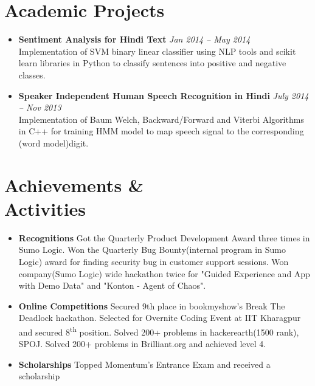 \documentclass[margin,line]{resume}
\begin{document}
\begin{resume}
    \section{\mysidestyle Academic Projects}
    \vspace{0mm}
       \begin{itemize}
            \item \textbf{Sentiment Analysis for Hindi Text} \hfill \textsl{Jan 2014 -- May 2014}\\ Implementation of SVM binary linear classifier using NLP tools and scikit learn libraries in Python to classify sentences into positive and negative classes.
            \item \textbf{Speaker Independent Human Speech Recognition in Hindi} \hfill \textsl{July 2014 -- Nov 2013}\\ Implementation of Baum Welch, Backward/Forward and Viterbi Algorithms in C++ for training HMM model to map speech signal to the corresponding (word model)digit.
       \end{itemize}
\section{\mysidestyle Achievements \& \\ Activities}
\vspace{0mm}
    \begin{itemize}
            \item \textbf{Recognitions} \vspace{0mm}
                \subitem Got the Quarterly Product Development Award three times in Sumo Logic.
                \subitem Won the Quarterly Bug Bounty(internal program in Sumo Logic) award for finding security bug in customer support sessions.
                \subitem Won company(Sumo Logic) wide hackathon twice for "Guided Experience and App with Demo Data" and  "Konton - Agent of Chaos".  
            \item \textbf{Online Competitions} \vspace{0mm}
                \subitem Secured 9th place in bookmyshow's Break The Deadlock hackathon.
                \subitem Selected for Overnite Coding Event at IIT Kharagpur and secured 8​\textsuperscript{th}​ position.
                \subitem Solved 200+ problems in hackerearth(1500 rank), SPOJ.
                \subitem Solved 200+ problems in Brilliant.org and achieved level 4.
            \item \textbf{Scholarships} \vspace{0mm}
                \subitem Topped Momentum's Entrance Exam and received a  scholarship
            

\end{itemize}
\end{resume}
\end{document}
